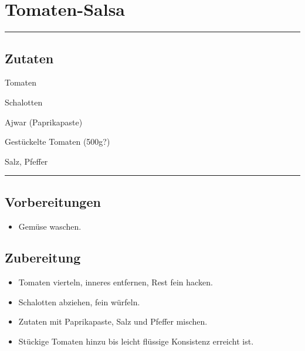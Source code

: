 \section*{Tomaten-Salsa}

\bigbreak
\rule{\textwidth}{0.4pt}

\subsection*{Zutaten}

\begin{description}[align=right,leftmargin=!,labelwidth=\widthof{\bfseries xxPrisen}]
    \item[4] Tomaten
    \item[2] Schalotten
    \item[2 EL] Ajwar (Paprikapaste)
    \item[1 Pkg] Gestückelte Tomaten (500g?)
    \item[Gewürze] Salz, Pfeffer
\end{description}


\rule{\textwidth}{0.4pt}


\subsection*{Vorbereitungen}

\begin{itemize}
    \item Gemüse waschen.
\end{itemize}


\bigbreak
\subsection*{Zubereitung}

\begin{itemize}
    \item Tomaten vierteln, inneres entfernen, Rest fein hacken.
    \item Schalotten abziehen, fein würfeln.
    \item Zutaten mit Paprikapaste, Salz und Pfeffer mischen.
    \item Stückige Tomaten hinzu bis leicht flüssige Konsistenz erreicht ist.
\end{itemize}
